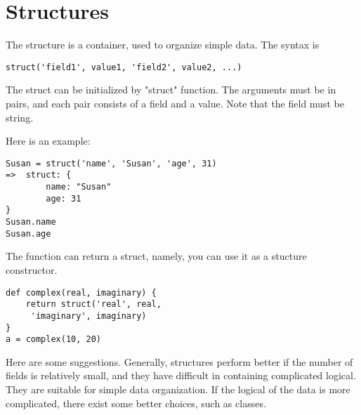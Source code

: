 \chapter{Structures}
The structure is a container, used to organize simple data. The syntax is
\begin{lstlisting}
struct('field1', value1, 'field2', value2, ...)
\end{lstlisting}
The struct can be initialized by "struct" function. The arguments must be in pairs, and each pair consists of a field and a value. Note that the field must be string.

Here is an example:
\begin{lstlisting}
Susan = struct('name', 'Susan', 'age', 31)
=>  struct: {
		name: "Susan"
		age: 31
}
Susan.name
Susan.age
\end{lstlisting}
The function can return a struct, namely, you can use it as a stucture constructor.

\begin{lstlisting}
def complex(real, imaginary) {
	return struct('real', real,
	 'imaginary', imaginary)
}
a = complex(10, 20)
\end{lstlisting}

Here are some suggestions. Generally, structures perform better if the number of fields is relatively small, and they have difficult in containing complicated logical. They are suitable for simple data organization. If the logical of the data is more complicated, there exist some better choices, such as classes. 
